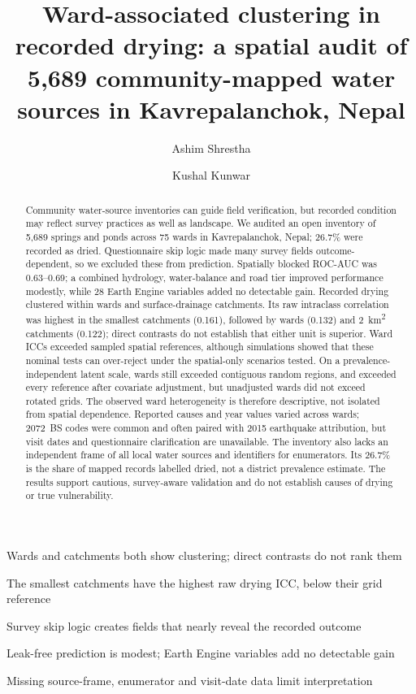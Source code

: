 \documentclass[preprint,12pt,authoryear]{elsarticle}
\begin{document}
\begin{frontmatter}

\begin{highlights}
\item Wards and catchments both show clustering; direct contrasts do not rank them
\item The smallest catchments have the highest raw drying ICC, below their grid reference
\item Survey skip logic creates fields that nearly reveal the recorded outcome
\item Leak-free prediction is modest; Earth Engine variables add no detectable gain
\item Missing source-frame, enumerator and visit-date data limit interpretation
\end{highlights}

\title{Ward-associated clustering in recorded drying: a spatial audit of 5,689 community-mapped water sources in Kavrepalanchok, Nepal}

\author[1]{Ashim Shrestha}
\author[1]{Kushal Kunwar}

\begin{abstract}
Community water-source inventories can guide field verification, but recorded condition may reflect survey practices as well as landscape. We audited an open inventory of 5,689 springs and ponds across 75 wards in Kavrepalanchok, Nepal; 26.7\% were recorded as dried. Questionnaire skip logic made many survey fields outcome-dependent, so we excluded these from prediction. Spatially blocked ROC-AUC was 0.63--0.69; a combined hydrology, water-balance and road tier improved performance modestly, while 28 Earth Engine variables added no detectable gain. Recorded drying clustered within wards and surface-drainage catchments. Its raw intraclass correlation was highest in the smallest catchments (0.161), followed by wards (0.132) and \SI{2}{\kilo\metre\squared} catchments (0.122); direct contrasts do not establish that either unit is superior. Ward ICCs exceeded sampled spatial references, although simulations showed that these nominal tests can over-reject under the spatial-only scenarios tested. On a prevalence-independent latent scale, wards still exceeded contiguous random regions, and exceeded every reference after covariate adjustment, but unadjusted wards did not exceed rotated grids. The observed ward heterogeneity is therefore descriptive, not isolated from spatial dependence. Reported causes and year values varied across wards; 2072~BS codes were common and often paired with 2015 earthquake attribution, but visit dates and questionnaire clarification are unavailable. The inventory also lacks an independent frame of all local water sources and identifiers for enumerators. Its 26.7\% is the share of mapped records labelled dried, not a district prevalence estimate. The results support cautious, survey-aware validation and do not establish causes of drying or true vulnerability.
\end{abstract}


\end{frontmatter}
\end{document}
